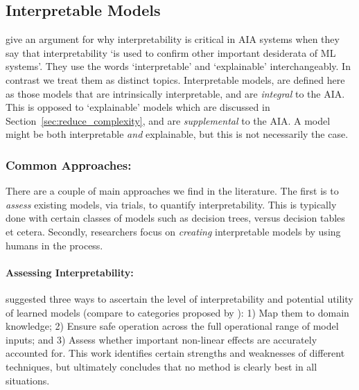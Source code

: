 \subsection{Interpretable Models} \label{sec:interp_models}
\citet{Doshi-Velez2017-xy} give an argument for why interpretability is critical in AIA systems when they say that interpretability `is used to confirm other important desiderata of ML systems'. They use the words `interpretable' and `explainable' interchangeably. In contrast we treat them as distinct topics. Interpretable models, are defined here as those models that are intrinsically interpretable, and are \emph{integral} to the AIA. This is opposed to `explainable' models which are discussed in Section~\ref{sec:reduce_complexity}, and are \emph{supplemental} to the AIA. A model might be both interpretable \emph{and} explainable, but this is not necessarily the case.

\subsubsection{Common Approaches:}
There are a couple of main approaches we find in the literature. The first is to \emph{assess} existing models, via trials, to quantify interpretability. This is typically done with certain classes of models such as decision trees, versus decision tables et cetera. Secondly, researchers focus on \emph{creating} interpretable models by using humans in the process.

\paragraph{Assessing Interpretability:}
\citet{Van_Belle2013-ph} suggested three ways to ascertain the level of interpretability and potential utility of learned models (compare to categories proposed by \citet{Lipton2016-ug}): 1) Map them to domain knowledge; 2) Ensure safe operation across the full operational range of model inputs; and 3) Assess whether important non-linear effects are accurately accounted for. This work identifies certain strengths and weaknesses of different techniques, but ultimately concludes that no method is clearly best in all situations.

